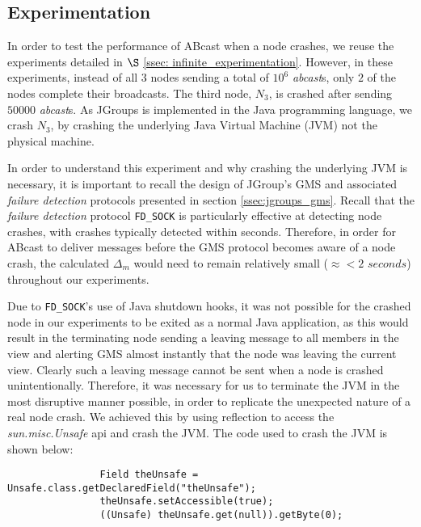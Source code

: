     \subsection{Experimentation}\label{ssec:crash_experiment}
    In order to test the performance of \textsf{ABcast} when a node crashes, we reuse the experiments detailed in $\S$ \ref{ssec: infinite_experimentation}.  However, in these experiments, instead of all $3$ nodes sending a total of $10^6$ \emph{abcast}s, only $2$ of the nodes complete their broadcasts.  The third node, $N_3$, is crashed after sending $50000$ \emph{abcast}s.  As JGroups is implemented in the Java programming language, we crash $N_3$, by crashing the underlying Java Virtual Machine (JVM) not the physical machine.  
    
    In order to understand this experiment and why crashing the underlying JVM is necessary, it is important to recall the design of JGroup's GMS and associated \emph{failure detection} protocols presented in section \ref{ssec:jgroups_gms}.  Recall that the \emph{failure detection} protocol \texttt{FD\_SOCK} is particularly effective at detecting node crashes, with crashes typically detected within seconds.  Therefore, in order for \textsf{ABcast} to deliver messages before the GMS protocol becomes aware of a node crash, the calculated $\Delta_m$ would need to remain relatively small ($\approx < 2$ $seconds$) throughout our experiments.  
    
    Due to \texttt{FD\_SOCK}'s use of Java shutdown hooks, it was not possible for the crashed node in our experiments to be exited as a normal Java application, as this would result in the terminating node sending a leaving message to all members in the view and alerting GMS almost instantly that the node was leaving the current view.  Clearly such a leaving message cannot be sent when a node is crashed unintentionally.  Therefore, it was necessary for us to terminate the JVM in the most disruptive manner possible, in order to replicate the unexpected nature of a real node crash.  We achieved this by using reflection to access the \emph{sun.misc.Unsafe} api and crash the JVM.  The code used to crash the JVM is shown below:
    
    \begin{minipage}{\linewidth}
	    \begin{lstlisting}
	            Field theUnsafe = Unsafe.class.getDeclaredField("theUnsafe");
	            theUnsafe.setAccessible(true);
	            ((Unsafe) theUnsafe.get(null)).getByte(0);
	    \end{lstlisting}
	\end{minipage}

